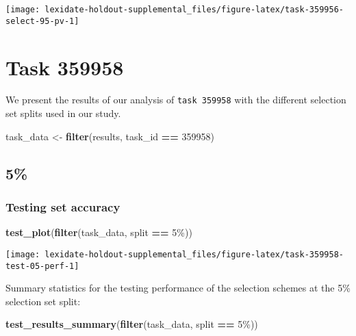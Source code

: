 \documentclass[
]{book}
\newenvironment{Shaded}{\begin{snugshade}}{\end{snugshade}}
\newcommand{\DecValTok}[1]{\textcolor[rgb]{0.00,0.00,0.81}{#1}}
\newcommand{\FunctionTok}[1]{\textcolor[rgb]{0.13,0.29,0.53}{\textbf{#1}}}
\newcommand{\NormalTok}[1]{#1}
\newcommand{\OtherTok}[1]{\textcolor[rgb]{0.56,0.35,0.01}{#1}}
\newcommand{\SpecialCharTok}[1]{\textcolor[rgb]{0.81,0.36,0.00}{\textbf{#1}}}
\newcommand{\StringTok}[1]{\textcolor[rgb]{0.31,0.60,0.02}{#1}}
\begin{document}
\texttt{[image: lexidate-holdout-supplemental\_files/figure-latex/task-359956-select-95-pv-1]}

\hypertarget{task-359958}{%
\chapter{Task 359958}\label{task-359958}}

We present the results of our analysis of \texttt{task\ 359958} with the different selection set splits used in our study.

\begin{Shaded}
\begin{Highlighting}[]
\NormalTok{task\_data }\OtherTok{\textless{}{-}} \FunctionTok{filter}\NormalTok{(results, task\_id }\SpecialCharTok{==} \DecValTok{359958}\NormalTok{)}
\end{Highlighting}
\end{Shaded}

\hypertarget{section-30}{%
\section{5\%}\label{section-30}}

\hypertarget{testing-set-accuracy-30}{%
\subsection{Testing set accuracy}\label{testing-set-accuracy-30}}

\begin{Shaded}
\begin{Highlighting}[]
\FunctionTok{test\_plot}\NormalTok{(}\FunctionTok{filter}\NormalTok{(task\_data, split }\SpecialCharTok{==} \StringTok{\textquotesingle{}5\%\textquotesingle{}}\NormalTok{))}
\end{Highlighting}
\end{Shaded}

\texttt{[image: lexidate-holdout-supplemental\_files/figure-latex/task-359958-test-05-perf-1]}

Summary statistics for the testing performance of the selection schemes at the 5\% selection set split:

\begin{Shaded}
\begin{Highlighting}[]
\FunctionTok{test\_results\_summary}\NormalTok{(}\FunctionTok{filter}\NormalTok{(task\_data, split }\SpecialCharTok{==} \StringTok{\textquotesingle{}5\%\textquotesingle{}}\NormalTok{))}
\end{Highlighting}
\end{Shaded}
\end{document}
